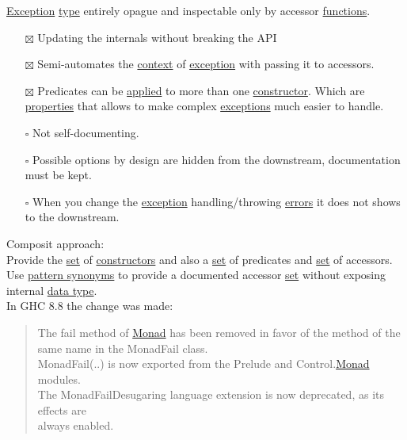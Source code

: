 \documentclass[a4paper,14pt,oneside]{book}
\begin{document}
\hyperref[org3882403]{Exception} \hyperref[org38dea24]{type} entirely opague and inspectable only by accessor \hyperref[org69a4fa1]{functions}.\\
\begin{itemize}
\item[{$\boxtimes$}] Updating the internals without breaking the API\\
\item[{$\boxtimes$}] Semi-automates the \hyperref[orgbaab0e5]{context} of \hyperref[org3882403]{exception} with passing it to accessors.\\
\item[{$\boxtimes$}] Predicates can be \hyperref[orgae39546]{applied} to more than one \hyperref[org963e62c]{constructor}. Which are \hyperref[org533778b]{properties} that allows to make complex \hyperref[org99ba80b]{exceptions} much easier to handle.\\
\item[{$\square$}] Not self-documenting.\\
\item[{$\square$}] Possible options by design are hidden from the downstream, documentation must be kept.\\
\item[{$\square$}] When you change the \hyperref[org3882403]{exception} handling/throwing \hyperref[org13e4be2]{errors} it does not shows to the downstream.\\
\end{itemize}

Composit approach:\\
Provide the \hyperref[org6f8bfa6]{set} of \hyperref[org68913c7]{constructors} and also a \hyperref[org6f8bfa6]{set} of predicates and \hyperref[org6f8bfa6]{set} of accessors.\\
Use \hyperref[org1b5027a]{pattern synonyms} to provide a documented accessor \hyperref[org6f8bfa6]{set} without exposing internal \hyperref[org2099f55]{data type}.\\

In GHC 8.8 the change was made:\\
\begin{quote}
The fail method of \hyperref[org026d995]{Monad} has been removed in favor of the method of the same name in the MonadFail class.\\

MonadFail(..) is now exported from the Prelude and Control.\hyperref[org026d995]{Monad} modules.\\
The MonadFailDesugaring language extension is now deprecated, as its effects are\\
always enabled.\\
\end{quote}
\end{document}
